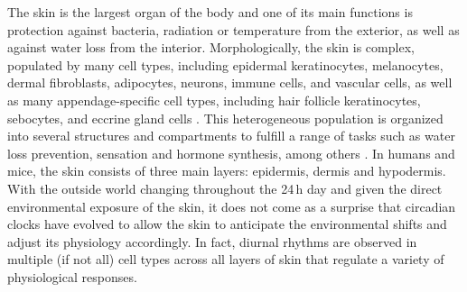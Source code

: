 The skin is the largest organ of the body and one of its main functions is protection against bacteria, radiation or temperature from the exterior, as well as against water loss from the interior. Morphologically, the skin is complex, populated by many cell types, including epidermal keratinocytes, melanocytes, dermal fibroblasts, adipocytes, neurons, immune cells, and vascular cells, as well as many appendage-specific cell types, including hair follicle keratinocytes, sebocytes, and eccrine gland cells \cite{Plikus2015}. This heterogeneous population is organized into several structures and compartments to fulfill a range of tasks such as water loss prevention, sensation and hormone synthesis, among others \cite{Wong2016, Zouboulis2009}. In humans and mice, the skin consists of three main layers: epidermis, dermis and hypodermis. With the outside world changing throughout the 24\,h day and given the direct environmental exposure of the skin, it does not come as a surprise that circadian clocks have evolved to allow the skin to anticipate the environmental shifts and adjust its physiology accordingly. In fact, diurnal rhythms are observed in multiple (if not all) cell types across all layers of skin that regulate a variety of physiological responses. \\ %
\newpage
